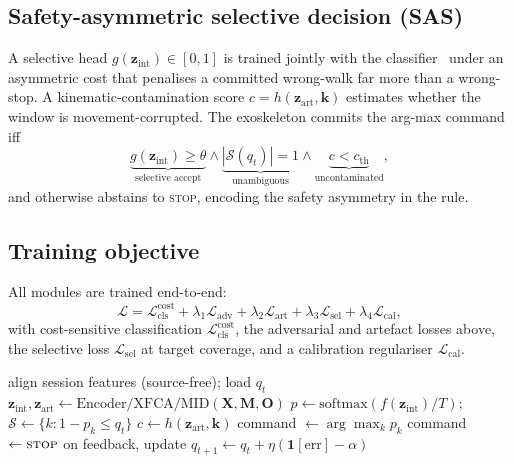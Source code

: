 \documentclass[conference]{IEEEtran}
\begin{document}
\subsection{Safety-asymmetric selective decision (SAS)}
A selective head $g(\mathbf{z}_{\mathrm{int}})\in[0,1]$ is trained jointly with the
classifier~\cite{geifman2019} under an asymmetric cost that penalises a committed
wrong-walk far more than a wrong-stop. A kinematic-contamination score
$c=h(\mathbf{z}_{\mathrm{art}},\mathbf{k})$ estimates whether the window is
movement-corrupted. The exoskeleton commits the arg-max command iff
\[
\underbrace{g(\mathbf{z}_{\mathrm{int}})\!\ge\!\theta}_{\text{selective accept}}\!\wedge\!
\underbrace{|\mathcal{S}(q_t)|\!=\!1}_{\text{unambiguous}}\!\wedge\!
\underbrace{c<c_{\mathrm{th}}}_{\text{uncontaminated}},
\]
and otherwise abstains to \textsc{stop}, encoding the safety asymmetry in the rule.

\subsection{Training objective}
All modules are trained end-to-end:
\begin{equation}
\mathcal{L}=\mathcal{L}_{\mathrm{cls}}^{\mathrm{cost}}
+\lambda_1\mathcal{L}_{\mathrm{adv}}
+\lambda_2\mathcal{L}_{\mathrm{art}}
+\lambda_3\mathcal{L}_{\mathrm{sel}}
+\lambda_4\mathcal{L}_{\mathrm{cal}},
\end{equation}
with cost-sensitive classification $\mathcal{L}_{\mathrm{cls}}^{\mathrm{cost}}$, the
adversarial and artefact losses above, the selective loss
$\mathcal{L}_{\mathrm{sel}}$ at target coverage, and a calibration regulariser
$\mathcal{L}_{\mathrm{cal}}$.

\begin{algorithm}[t]
\caption{CALM-Net deployment on session $s$ (per window)}
\label{alg:deploy}
\begin{algorithmic}[1]
\State align session features (source-free); load $q_t$
\State $\mathbf{z}_{\mathrm{int}},\mathbf{z}_{\mathrm{art}}\leftarrow \mathrm{Encoder/XFCA/MID}(\mathbf{X},\mathbf{M},\mathbf{O})$
\State $p\leftarrow \mathrm{softmax}(f(\mathbf{z}_{\mathrm{int}})/T)$;\quad
       $\mathcal{S}\leftarrow\{k:1-p_k\le q_t\}$
\State $c\leftarrow h(\mathbf{z}_{\mathrm{art}},\mathbf{k})$
   \State command $\leftarrow \arg\max_k p_k$
\Else
   \State command $\leftarrow \textsc{stop}$ 
\EndIf
\State on feedback, update $q_{t+1}\leftarrow q_t+\eta(\mathbf{1}[\text{err}]-\alpha)$
\end{algorithmic}
\end{algorithm}
\end{document}
